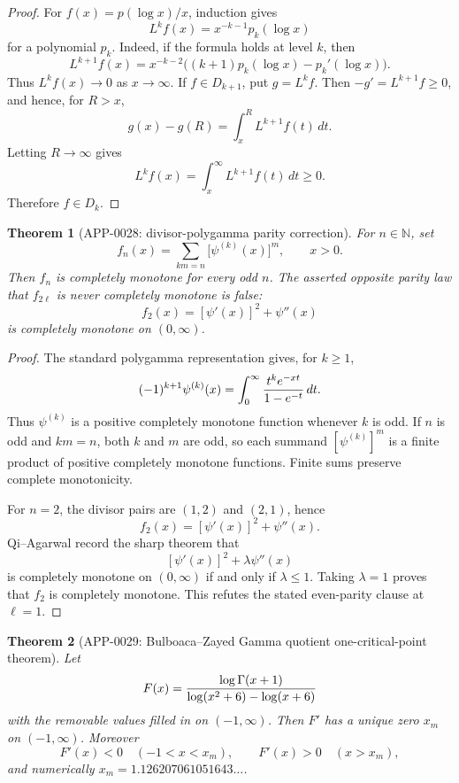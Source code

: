 \documentclass[11pt]{article}
\numberwithin{equation}{section}
\newtheorem{theorem}{Theorem}[section]
\theoremstyle{definition}
\theoremstyle{remark}
\newcommand{\1}{\mathbf 1}
\begin{document}
\begin{proof}
For \(f(x)=p(\log x)/x\), induction gives
\[
 L^k f(x)=x^{-k-1}p_k(\log x)
\]
for a polynomial \(p_k\).  Indeed, if the formula holds at level \(k\), then
\[
 L^{k+1}f(x)
 =x^{-k-2}\bigl((k+1)p_k(\log x)-p_k'(\log x)\bigr).
\]
Thus \(L^k f(x)\to0\) as \(x\to\infty\).  If \(f\in D_{k+1}\), put
\(g=L^k f\).  Then \(-g'=L^{k+1}f\ge0\), and hence, for \(R>x\),
\[
 g(x)-g(R)=\int_x^R L^{k+1}f(t)\,dt .
\]
Letting \(R\to\infty\) gives
\[
 L^k f(x)=\int_x^\infty L^{k+1}f(t)\,dt\ge0.
\]
Therefore \(f\in D_k\).
\end{proof}

\begin{theorem}[APP-0028: divisor-polygamma parity correction]
\label{thm:app28-qa-divisor-polygamma}
For \(n\in\mathbb N\), set
\[
 f_n(x)=\sum_{km=n}\bigl[\psi^{(k)}(x)\bigr]^m,\qquad x>0.
\]
Then \(f_n\) is completely monotone for every odd \(n\).  The asserted
opposite parity law that \(f_{2\ell}\) is never completely monotone is false:
\[
 f_2(x)=[\psi'(x)]^2+\psi''(x)
\]
is completely monotone on \((0,\infty)\).
\end{theorem}

\begin{proof}
The standard polygamma representation gives, for \(k\ge1\),
\[
 (-1)^{k+1}\psi^{(k)}(x)
 =\int_0^\infty {t^ke^{-xt}\over1-e^{-t}}\,dt .
\]
Thus \(\psi^{(k)}\) is a positive completely monotone function whenever
\(k\) is odd.  If \(n\) is odd and \(km=n\), both \(k\) and \(m\) are odd, so
each summand \([\psi^{(k)}]^m\) is a finite product of positive completely
monotone functions.  Finite sums preserve complete monotonicity.

For \(n=2\), the divisor pairs are \((1,2)\) and \((2,1)\), hence
\[
 f_2(x)=[\psi'(x)]^2+\psi''(x).
\]
Qi--Agarwal record the sharp theorem that
\[
 [\psi'(x)]^2+\lambda\psi''(x)
\]
is completely monotone on \((0,\infty)\) if and only if \(\lambda\le1\).
Taking \(\lambda=1\) proves that \(f_2\) is completely monotone.  This refutes
the stated even-parity clause at \(\ell=1\).
\end{proof}

\begin{theorem}[APP-0029: Bulboaca--Zayed Gamma quotient one-critical-point theorem]
\label{thm:app29-bz-gamma-quotient}
Let
\[
 F(x)=
 {\log\Gamma(x+1)\over \log(x^2+6)-\log(x+6)}
\]
with the removable values filled in on \((-1,\infty)\).  Then \(F'\) has a
unique zero \(x_m\) on \((-1,\infty)\).  Moreover
\[
 F'(x)<0\quad(-1<x<x_m),\qquad
 F'(x)>0\quad(x>x_m),
\]
and numerically \(x_m=1.126207061051643\ldots\).
\end{theorem}
\end{document}
